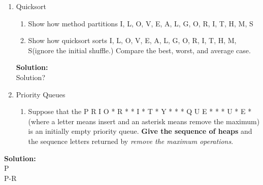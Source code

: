 \documentclass{article}\usepackage{amsmath,amssymb,amsthm,tikz,tkz-graph,color,chngpage,soul,hyperref,csquotes,graphicx,floatrow}\newcommand*{\QEDB}{\hfill\ensuremath{\square}}\newtheorem*{prop}{Proposition}\renewcommand{\theenumi}{\alph{enumi}}\usepackage[shortlabels]{enumitem}\usepackage[nobreak=true]{mdframed}\usetikzlibrary{matrix,calc}\MakeOuterQuote{"}\usepackage[margin=0.75in]{geometry} \newtheorem{theorem}{Theorem}
\begin{document}
\begin{enumerate}[1.]
\begin{enumerate}[a)]
\end{enumerate}



\item Quicksort
\begin{enumerate}[1)]
\item Show how method partitions I, L, O, V, E, A, L, G, O, R, I, T, H, M, S
\item Show how quicksort sorts I, L, O, V, E, A, L, G, O, R, I, T, H, M, S(ignore the initial shuffle.) Compare the best, worst, and average case.
\end{enumerate}

\begin{mdframed}
\textbf{Solution:} \\
Solution?
\end{mdframed}



\item Priority Queues
\begin{enumerate}[1)]
\item Suppose that the P R I O * R * * I * T * Y * * * Q U E * * * U * E * (where a letter means insert and an asterisk means remove the maximum) is an initially empty priority queue. \textbf{Give the sequence of heaps} and the sequence letters returned by \textit{remove the maximum operations}.
\end{enumerate}

\end{enumerate}

\begin{mdframed}
\textbf{Solution:} \\
P \\
P-R\\

\end{mdframed}
\end{document}
